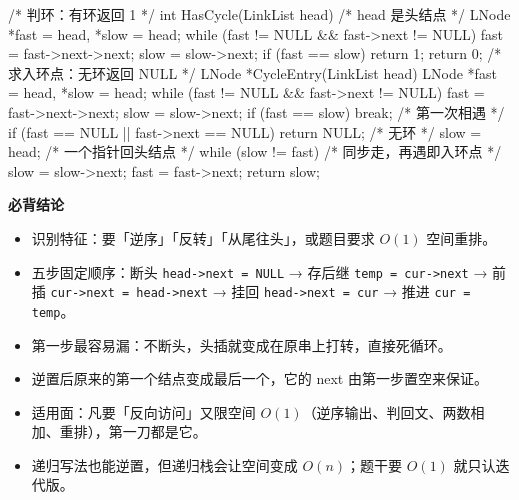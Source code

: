 \documentclass[10pt,a4paper]{ctexart}
\begin{document}
\begin{codebox}
/* 判环：有环返回 1 */
int HasCycle(LinkList head) {              /* head 是头结点 */
    LNode *fast = head, *slow = head;
    while (fast != NULL && fast->next != NULL) {
        fast = fast->next->next;
        slow = slow->next;
        if (fast == slow) return 1;
    }
    return 0;
}
/* 求入环点：无环返回 NULL */
LNode *CycleEntry(LinkList head) {
    LNode *fast = head, *slow = head;
    while (fast != NULL && fast->next != NULL) {
        fast = fast->next->next;
        slow = slow->next;
        if (fast == slow) break;           /* 第一次相遇 */
    }
    if (fast == NULL || fast->next == NULL) return NULL;   /* 无环 */
    slow = head;                           /* 一个指针回头结点 */
    while (slow != fast) {                 /* 同步走，再遇即入环点 */
        slow = slow->next;
        fast = fast->next;
    }
    return slow;
}
\end{codebox}




\textbf{必背结论}

\begin{itemize}

\item 识别特征：要「逆序」「反转」「从尾往头」，或题目要求 $O(1)$ 空间重排。

\item 五步固定顺序：断头 \texttt{head->next = NULL} → 存后继 \texttt{temp = cur->next} → 前插 \texttt{cur->next = head->next} → 挂回 \texttt{head->next = cur} → 推进 \texttt{cur = temp}。

\item 第一步最容易漏：不断头，头插就变成在原串上打转，直接死循环。

\item 逆置后原来的第一个结点变成最后一个，它的 next 由第一步置空来保证。

\item 适用面：凡要「反向访问」又限空间 $O(1)$（逆序输出、判回文、两数相加、重排），第一刀都是它。

\item 递归写法也能逆置，但递归栈会让空间变成 $O(n)$；题干要 $O(1)$ 就只认迭代版。

\end{itemize}
\end{document}

